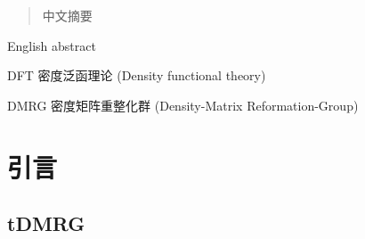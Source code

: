 \documentclass[
    ]{njuthesis}
\begin{document}

\maketitle



\begin{abstract}
    中文摘要
\end{abstract}

\begin{abstract*}
    English abstract
\end{abstract*}

\tableofcontents
\listoffigures
\listoftables

\mainmatter

\begin{notation}[10cm]
  \item[DFT] 密度泛函理论 (Density functional theory)
  \item[DMRG] 密度矩阵重整化群 (Density-Matrix Reformation-Group)
\end{notation}

%   
%   

\chapter{引言}

\section{tDMRG}
\end{document}
